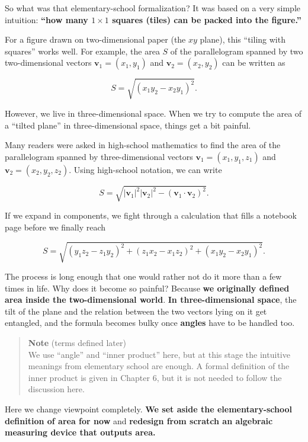 \documentclass[a4paper,12pt,openany]{book}
\begin{document}
So what was that elementary-school formalization? It was based on a very
simple intuition: \textbf{``how many \(1\times 1\) squares (tiles) can
be packed into the figure.''}

For a figure drawn on two-dimensional paper (the \(xy\) plane), this
``tiling with squares'' works well. For example, the area \(S\) of the
parallelogram spanned by two two-dimensional vectors
\(\mathbf{v}_1=(x_1,y_1)\) and \(\mathbf{v}_2=(x_2,y_2)\) can be written
as

\[S=\sqrt{(x_1 y_2-x_2 y_1)^2}.\]

However, we live in three-dimensional space. When we try to compute the
area of a ``tilted plane'' in three-dimensional space, things get a bit
painful.

Many readers were asked in high-school mathematics to find the area of
the parallelogram spanned by three-dimensional vectors
\(\mathbf{v}_1=(x_1,y_1,z_1)\) and \(\mathbf{v}_2=(x_2,y_2,z_2)\). Using
high-school notation, we can write

\[
S=\sqrt{|\mathbf{v}_1|^2|\mathbf{v}_2|^2-(\mathbf{v}_1\cdot\mathbf{v}_2)^2}.
\]

If we expand in components, we fight through a calculation that fills a
notebook page before we finally reach

\[S=\sqrt{(y_1 z_2-z_1 y_2)^2+(z_1 x_2-x_1 z_2)^2+(x_1 y_2-x_2 y_1)^2}.\]

The process is long enough that one would rather not do it more than a
few times in life. Why does it become so painful? Because
\textbf{we originally defined area inside the two-dimensional world}.
\textbf{In three-dimensional space}, the tilt of the plane and the
relation between the two vectors lying on it get entangled, and the
formula becomes bulky once \textbf{angles} have to be handled too.

\begin{quote}
\textbf{Note} (terms defined later)\\
We use ``angle'' and ``inner product'' here, but at this stage the
intuitive meanings from elementary school are enough. A formal
definition of the inner product is given in Chapter 6, but it is not
needed to follow the discussion here.
\end{quote}

Here we change viewpoint completely.
\textbf{We set aside the elementary-school definition of area for now}
and
\textbf{redesign from scratch an algebraic measuring device that outputs area.}

\par\vspace{0.35em}\par
\end{document}
